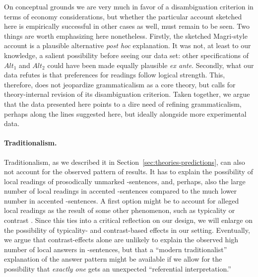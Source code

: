 \documentclass[fleqn,reqno,10pt]{article}
\newcommand{\as}{\acro{as}}
\renewcommand{\es}{\acro{es}}
\begin{document}
On conceptual grounds we are very much in favor of a disambiguation
criterion in terms of economy considerations, but whether the
particular account sketched here is empirically successful in other
cases as well, must remain to be seen. Two things are worth
emphasizing here nonetheless. Firstly, the sketched Magri-style
account is a plausible alternative \emph{post hoc} explanation. It was
not, at least to our knowledge, a salient possibility before seeing
our data set: other specifications of $Alt_1$ and $Alt_2$ could have
been made equally plausible \emph{ex ante}. Secondly, what our data
refutes is that preferences for readings follow logical
strength. This, therefore, does not jeopardize grammaticalism as a
core theory, but calls for theory-internal revision of its
disambiguation criterion. Taken together, we argue that the data
presented here points to a dire need of refining grammaticalism,
perhaps along the lines suggested here, but ideally alongside more
experimental data.

\paragraph{Traditionalism.} Traditionalism, as we described it in
Section~\ref{sec:theories-predictions}, can also not account for the
observed pattern of results. It has to explain the possibility of
local readings of prosodically unmarked \es-sentences, and, perhaps,
also the large number of local readings in accented \es-sentences
compared to the much lower number in accented \as-sentences. A first
option might be to account for alleged local readings as the result of
some other phenomenon, such as typicality or contrast
\citep{Tielvan-Tiel2012:Embedded-Scalar,GeurtsTielvan-Tiel2013:Embedded-Scalar,Tielvan-Tiel2014:Quantity-Matter}.
Since this ties into a critical reflection on our design, we will
enlarge on the possibility of typicality- and contrast-based effects
in our setting. Eventually, we argue that contrast-effects alone are
unlikely to explain the observed high number of local answers in
\es-sentences, but that a ``modern traditionalist'' explanation of the
answer pattern might be available if we allow for the possibility that
\emph{exactly one} gets an unexpected ``referential interpretation.''
\end{document}
